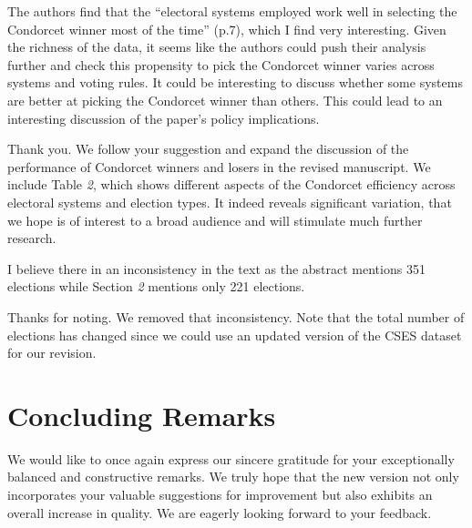 \documentclass[a4paper, 12pt]{scrartcl}
\theoremstyle{break}
\newenvironment{changes}{\par\color{violet}\par\addvspace{\baselineskip}}{\par\addvspace{\baselineskip}}
\begin{document}
\begin{changes}
The authors ﬁnd that the “electoral systems employed work well in selecting the Condorcet winner most of the time” (p.7), which I ﬁnd very interesting. Given the richness of the data, it seems like the authors could push their analysis further and check this propensity to pick the 	Condorcet winner varies across systems and voting rules. It could be interesting to discuss whether some systems are better at picking the Condorcet winner than others. This could lead to an interesting discussion of the paper’s policy implications.
\end{changes}

Thank you. We follow your suggestion and expand the discussion of the performance of Condorcet winners and losers in the revised manuscript. We include Table \emph{2}, which shows different aspects of the Condorcet efficiency across electoral systems and election types. It indeed reveals significant variation, that we hope is of interest to a broad audience and will stimulate much further research. 

\begin{changes}
I believe there in an inconsistency in the text as the abstract mentions 351 elections while Section \emph{2} mentions only 221 elections.
\end{changes}

Thanks for noting. We removed that inconsistency. Note that the total number of elections has changed since we could use an updated version of the CSES dataset for our revision.


\newpage
\section*{Concluding Remarks}

We would like to once again express our sincere gratitude for your exceptionally balanced and constructive remarks. We truly hope that the new version not only incorporates your valuable suggestions for improvement but also exhibits an overall increase in quality. We are eagerly looking forward to your feedback.



\end{document}

